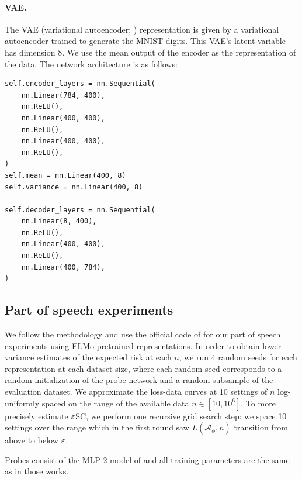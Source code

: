\begin{subappendices}
\paragraph{VAE.}
The VAE (variational autoencoder; \citet{Kingma2014AutoEncodingVB,Rezende2014StochasticBA}) representation is given by a variational autoencoder trained to generate the MNIST digits.
This VAE's latent variable has dimension 8.
We use the mean output of the encoder as the representation of the data.
The network architecture is as follows:
\begin{verbatim}
self.encoder_layers = nn.Sequential(
    nn.Linear(784, 400),
    nn.ReLU(),
    nn.Linear(400, 400),
    nn.ReLU(),
    nn.Linear(400, 400),
    nn.ReLU(),
)
self.mean = nn.Linear(400, 8)
self.variance = nn.Linear(400, 8)

self.decoder_layers = nn.Sequential(
    nn.Linear(8, 400),
    nn.ReLU(),
    nn.Linear(400, 400),
    nn.ReLU(),
    nn.Linear(400, 784),
)
\end{verbatim}

\subsection{Part of speech experiments}

We follow the methodology and use the official code of \citet{Voita2020InformationTheoreticPW} for our part of speech experiments using ELMo \citep{Peters2018DeepCW} pretrained representations.
In order to obtain lower-variance estimates of the expected risk at each $n$, we run 4 random seeds for each representation at each dataset size, where each random seed corresponds to a random initialization of the probe network and a random subsample of the evaluation dataset.
We approximate the loss-data curves at 10 settings of $n$ log-uniformly spaced on the range of the available data $n \in [10, 10^6]$.
To more precisely estimate $\varepsilon$SC, we perform one recursive grid search step: we space 10 settings over the range which in the first round saw $L(\mathcal{A}_\phi, n)$ transition from above to below $\varepsilon$.

Probes consist of the MLP-2 model of \citet{Hewitt2019DesigningProbes,Voita2020InformationTheoreticPW} and all training parameters are the same as in those works.
\end{subappendices}
\printendnotes